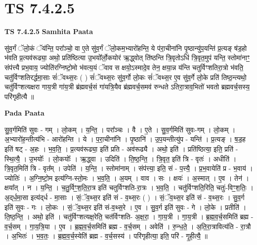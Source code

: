 \documentclass[17pt]{extarticle}
\begin{document}
\section*{ TS 7.4.2.5 }

\textbf{TS 7.4.2.5 } \newline
\textbf{Samhita Paata} \newline

सु॑व॒र्गं ॅलो॒कं ॅय॑न्ति॒ परा᳚ञ्चो॒ वा ए॒ते सु॑व॒र्गं ॅलो॒कम॒भ्यारो॑हन्ति॒ ये प॑रा॒चीना॑नि पृ॒ष्ठान्यु॑प॒यन्ति॑ प्र॒त्यङ् ष॑ड॒हो भ॑वति प्र॒त्यव॑रूढ्या॒ अथो॒ प्रति॑ष्ठित्या उ॒भयो᳚र्लो॒कयोर॑ ऋ॒द्ध्वोत् ति॑ष्ठन्ति त्रि॒वृतोऽधि॑ त्रि॒वृत॒मुप॑ यन्ति॒ स्तोमा॑नाꣳ॒॒ संप॑त्त्यै प्रभ॒वाय॒ ज्योति॑रग्निष्टो॒मो भ॑वत्य॒यं ॅवाव स क्षयो॒ऽस्मादे॒व तेन॒ क्षया॒न्न य॑न्ति चतुर्विꣳशतिरा॒त्रो भ॑वति॒ चतु॑र्विꣳशतिरर्द्धमा॒साः सं॑ॅवथ्स॒रः ( ) सं॑ॅवथ्स॒रः सु॑व॒र्गो लो॒कः सं॑ॅवथ्स॒र ए॒व सु॑व॒र्गे लो॒के प्रति॑ तिष्ठ॒न्त्यथो॒ चतु॑र्विꣳशत्यक्षरा गाय॒त्री गा॑य॒त्री ब्र॑ह्मवर्च॒सं गा॑यत्रि॒यैव ब्र॑ह्मवर्च॒समव॑ रुन्धते ऽतिरा॒त्राव॒भितो॑ भवतो ब्रह्मवर्च॒सस्य॒ परि॑गृहीत्यै ॥ \newline

\textbf{Pada Paata} \newline

सु॒व॒र्गमिति॑ सुवः - गम् । लो॒कम् । य॒न्ति॒ । परा᳚ञ्चः । वै । ए॒ते । सु॒व॒र्गमिति॑ सुवः-गम् । लो॒कम् । अ॒भ्यारो॑ह॒न्तीत्य॑भि - आरो॑हन्ति । ये । प॒रा॒चीना॑नि । पृ॒ष्ठानि॑ । उ॒प॒यन्तीत्यु॑प - यन्ति॑ । प्र॒त्यङ् । ष॒ड॒ह इति॑ षट् - अ॒हः । भ॒व॒ति॒ । प्र॒त्यव॑रूढ्या॒ इति॑ प्रति - अव॑रूढ्यै । अथो॒ इति॑ । प्रति॑ष्ठित्या॒ इति॒ प्रति॑ - स्थि॒त्यै॒ । उ॒भयोः᳚ । लो॒कयोः᳚ । ऋ॒द्ध्वा । उदिति॑ । ति॒ष्ठ॒न्ति॒ । त्रि॒वृत॒ इति॑ त्रि - वृतः॑ । अधीति॑ । त्रि॒वृत॒मिति॑ त्रि - वृत᳚म् । उपेति॑ । य॒न्ति॒ । स्तोमा॑नाम् । संप॑त्त्या॒ इति॒ सं - प॒त्त्यै॒ । प्र॒भ॒वायेति॑ प्र - भ॒वाय॑ । ज्योतिः॑ । अ॒ग्नि॒ष्टो॒म इत्य॑ग्नि-स्तो॒मः । भ॒व॒ति॒ । अ॒यम् । वाव । सः । क्षयः॑ । अ॒स्मात् । ए॒व । तेन॑ । क्षया᳚त् । न । य॒न्ति॒ । च॒तु॒र्विꣳ॒॒श॒ति॒रा॒त्र इति॑ चतुर्विꣳशति-रा॒त्रः । भ॒व॒ति॒ । चतु॑र्विꣳशति॒रिति॒ चतुः॑-विꣳ॒॒श॒तिः॒ । अ॒द्‌र्ध॒मा॒सा इत्य॑द्‌र्ध - मा॒साः । सं॒ॅव॒थ्स॒र इति॑ सं - व॒थ्स॒रः ( ) । सं॒ॅव॒थ्स॒र इति॑ सं - व॒थ्स॒रः । सु॒व॒र्ग इति॑ सुवः - गः । लो॒कः । सं॒ॅव॒थ्स॒र इति॑ सं-व॒थ्स॒रे । ए॒व । सु॒व॒र्ग इति॑ सुवः - गे । लो॒के । प्रतीति॑ । ति॒ष्ठ॒न्ति॒ । अथो॒ इति॑ । चतु॑र्विꣳशत्यक्ष॒रेति॒ चत॑र्विꣳशति- अ॒क्ष॒रा॒ । गा॒य॒त्री । गा॒य॒त्री । ब्र॒ह्म॒व॒र्च॒समिति॑ ब्रह्म - व॒र्च॒सम् । गा॒य॒त्रि॒या । ए॒व । ब्र॒ह्म॒व॒र्च॒समिति॑ ब्रह्म - व॒र्च॒सम् । अवेति॑ । रु॒न्ध॒ते॒ । अ॒ति॒रा॒त्रावित्य॑ति - रा॒त्रौ । अ॒भितः॑ । भ॒व॒तः॒ । ब्र॒ह्म॒व॒र्च॒स्येति॑ ब्रह्म - व॒र्च॒सस्य॑ । परि॑गृहीत्या॒ इति॒ परि॑ - गृ॒ही॒त्यै॒ ॥  \newline
\end{document}
